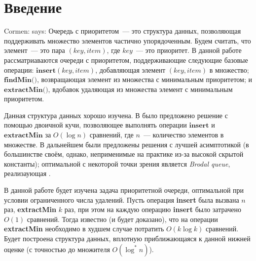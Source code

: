 \chapter*{Введение}							%


Cormen: \cite[wrewer]{Knuth} says:
Очередь с приоритетом~--- это структура данных, позволяющая поддерживать
множество элементов частично упорядоченным. Будем считать, что элемент~---
это пара $(\textit{key}, \textit{item})$, где $key$~--- это приоритет.
В данной работе рассматриаваются очереди с приоритетом, поддерживающие следующие
базовые операции: $\textbf{insert}(key, item)$, добавляющая элемент $(key, item)$
в множество; $\textbf{findMin()}$, возвращающая элемент из множества
с минимальным приоритетом; и $\textbf{extractMin()}$, вдобавок удаляющая
из множества элемент с минимальным приоритетом.

Данная структура данных хорошо изучена. В  \cite{Cormen} было предложено решение с помощью двоичной кучи, позволяющее выполнять
операции $\textbf{insert}$ и $\textbf{extractMin}$ за $O(\log n)$ сравнений, где $n$~---
количество элементов в множестве. В дальнейшем были предложены решения с лучшей
асимптотикой (в большинстве своём, однако, неприменимые на практике из-за высокой
скрытой константы); оптимальной с некоторой точки зрения является 
\emph{Brodal queue}, реализаующая .

В данной работе будет изучена задача приоритетной очереди, оптимальной
при условии ограниченного числа удалений. Пусть операция \textbf{insert}
была вызвана $n$ раз, \textbf{extractMin} $k$ раз, при этом на каждую
операцию \textbf{insert} было затрачено $O(1)$ сравнений. Тогда известно
(и будет доказано), что на операции \textbf{extractMin} необходимо в худшем
случае потратить $O(k \log k)$ сравнений. Будет построена структура
данных, вплотную приближающаяся к данной нижней оценке (с точностью до
множителя $O(\log^* n)$).



%
